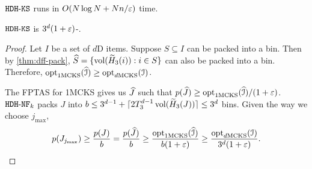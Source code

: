 $\hdhks$ runs in $O(N\log N + Nn/\eps)$ time.

\begin{theorem}
\label{thm:emb-ks}
$\hdhks$ is $3^d(1+\eps)$-\appx{}.
\end{theorem}
\begin{proof}
Let $I$ be a set of $d$D items.
Suppose $S \subseteq I$ can be packed into a bin.
Then by \cref{thm:dff-pack}, $\widehat{S} = \{\vol(\wHk[3](i)): i \in S\}$
can also be packed into a bin. Therefore, $\optdmcks[1](\Icalhat) \ge \optdmcks(\Ical)$.

The FPTAS for 1MCKS gives us $\Jhat$ such that
$p(\Jhat) \ge \optdmcks[1](\Icalhat)/(1+\eps)$.
$\hdhknf$ packs $J$ into
$b \le 3^{d-1} + \smallceil{2T_3^{d-1}\vol(\wHk[3](J))} \le 3^d$ bins.
Given the way we choose $j_{\max}$,
\[ p(J_{j_{\max}}) \ge \frac{p(J)}{b} = \frac{p(\Jhat)}{b}
\ge \frac{\optdmcks[1](\Icalhat)}{b(1+\eps)} \ge \frac{\optdmcks(\Ical)}{3^d(1+\eps)}.
\qedhere \]
\end{proof}
